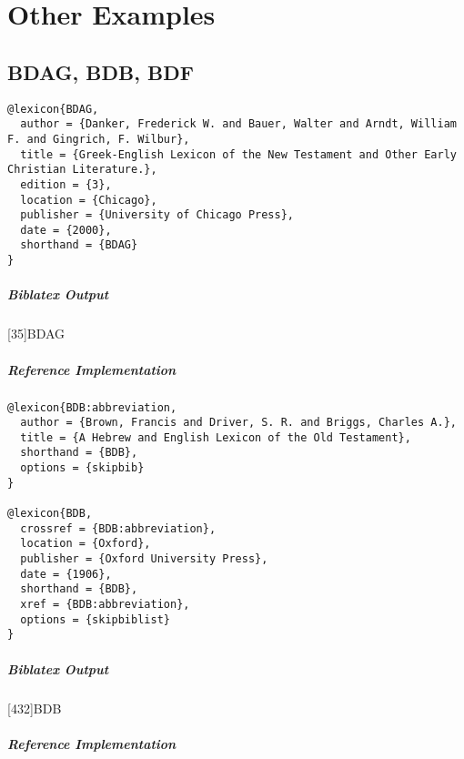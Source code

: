 \documentclass[a4paper]{article}
\newenvironment{biboutput}{%
  \subparagraph{Biblatex Output}
}{\color{black}}
\newenvironment{refimp}{%
  \subparagraph{Reference Implementation}
  \color{reference-colour}
  \rm
}{\par\color{black}}
\begin{document}
\section{Other Examples}

\subsection{BDAG, BDB, BDF}

\begin{lstlisting}
@lexicon{BDAG,
  author = {Danker, Frederick W. and Bauer, Walter and Arndt, William F. and Gingrich, F. Wilbur},
  title = {Greek-English Lexicon of the New Testament and Other Early Christian Literature.},
  edition = {3},
  location = {Chicago},
  publisher = {University of Chicago Press},
  date = {2000},
  shorthand = {BDAG}
}
\end{lstlisting}

\begin{biboutput}
  [35]{BDAG}
\end{biboutput}

\begin{refimp}
\end{refimp}

\medskip

\begin{lstlisting}
@lexicon{BDB:abbreviation,
  author = {Brown, Francis and Driver, S. R. and Briggs, Charles A.},
  title = {A Hebrew and English Lexicon of the Old Testament},
  shorthand = {BDB},
  options = {skipbib}
}

@lexicon{BDB,
  crossref = {BDB:abbreviation},
  location = {Oxford},
  publisher = {Oxford University Press},
  date = {1906},
  shorthand = {BDB},
  xref = {BDB:abbreviation},
  options = {skipbiblist}
}
\end{lstlisting}

\begin{biboutput}
  [432]{BDB}
\end{biboutput}

\begin{refimp}
\end{refimp}
\end{document}
